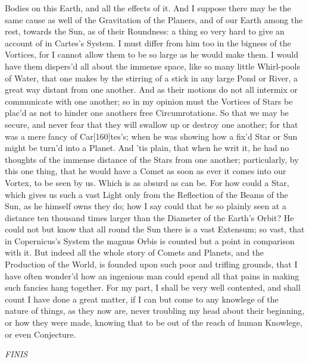 \documentclass[letterpaper]{book}
\begin{document}
Bodies on this Earth, and all the effects of it. And I suppose there may be
the same cause as well of the Gravitation of the Planers, and of our Earth
among the rest, towards the Sun, as of their Roundness: a thing so very
hard to give an account of in Cartes's System.
I must differ from him too in the bigness of the Vortices, for I cannot allow
them to be so large as he would make them. I would have them dispers'd
all about the immense space, like so many little Whirl-pools of Water, that
one makes by the stirring of a stick in any large Pond or River, a great
way distant from one another. And as their motions do not all intermix or
communicate with one another; so in my opinion must the Vortices of Stars
be plac'd as not to hinder one anothers free Circumrotations.
So that we may be secure, and never fear that they will swallow up or
destroy one another; for that was a mere fancy of Car[160]tes's; when he
was showing how a fix'd Star or Sun might be turn'd into a Planet. And 'tis
plain, that when he writ it, he had no thoughts of the immense distance of
the Stars from one another; particularly, by this one thing, that he would
have a Comet as soon as ever it comes into our Vortex, to be seen by us.
Which is as absurd as can be. For how could a Star, which gives us such a
vast Light only from the Reflection of the Beams of the Sun, as he himself
owns they do; how I say could that be so plainly seen at a distance ten
thousand times larger than the Diameter of the Earth's Orbit? He could
not but know that all round the Sun there is a vast Extensum; so vast,
that in Copernicus's System the magnus Orbis is counted but a point in
comparison with it. But indeed all the whole story of Comets and Planets,
and the Production of the World, is founded upon such poor and trifling
grounds, that I have often wonder'd how an ingenious man could spend all
that pains in making such fancies hang together. For my part, I shall be
very well contented, and shall count I have done a great matter, if I can
but come to any knowlege of the nature of things, as they now are, never
troubling my head about their beginning, or how they were made, knowing
that to be out of the reach of human Knowlege, or even Conjecture.

\em{FINIS}
\end{document}
